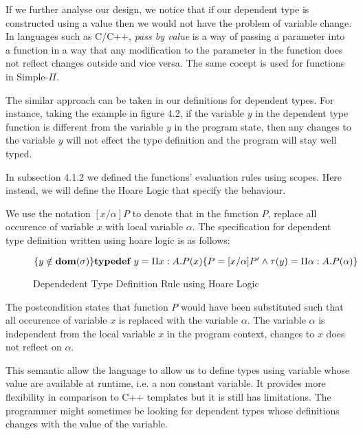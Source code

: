 \documentclass[a4paper,12pt]{report}
\begin{document}
If we further analyse our design, we notice that if our dependent type is 
constructed using a value then we would not have the problem of variable change. 
In languages such as C/C++, \textit{pass by value} \cite{pbv} is a way of 
passing a parameter into a function in a way that any modification to the 
parameter in the function does not reflect changes outside and vice versa. The 
same cocept is used for functions in Simple-$\Pi$.

\par
The similar approach can be taken in our definitions for dependent types. For 
instance, taking the example in figure 4.2, if the variable $y$ in the dependent 
type function is different from the variable $y$ in the program state, then any 
changes to the variable $y$ will not effect the type definition and the program 
will stay well typed.
 
\par
In subsection 4.1.2 we defined the functions' evaluation rules using scopes. 
Here instead, we will define the Hoare Logic that specify the behaviour.

\par 
We use the notation $[x/\alpha]P$ to denote that in the function $P$, replace all 
occurence of variable $x$ with local variable $\alpha$. 
The specification for dependent type definition written using hoare logic is as follows: 

\begin{figure}[H]
  \begin{center}
    \small$\{y \notin \text{\textbf{dom}}(\sigma)\}
    \textbf{typedef }y = \Pi x : A. P(x)\{P =  [x/\alpha]P' \wedge \tau(y) =  \Pi \alpha : A. P(\alpha)\}$ 
    \normalsize
  \end{center}
  \caption{Dependedent Type Definition Rule using Hoare Logic}
\end{figure}

\par
The postcondition states that function $P$ would have been substituted 
such that all occurence of variable $x$ is replaced with the variable $\alpha$. 
The variable $\alpha$ is independent from the local variable $x$ in the program 
context, changes to $x$ does not reflect on $\alpha$. 

\par
This semantic allow the language to allow us to define types using variable 
whose value are available at runtime, i.e. a non constant variable. It provides 
more flexibility in comparison to C++ templates but it is still has limitations. The 
programmer might sometimes be looking for dependent types whose definitions 
changes with the value of the variable. 
\end{document}

